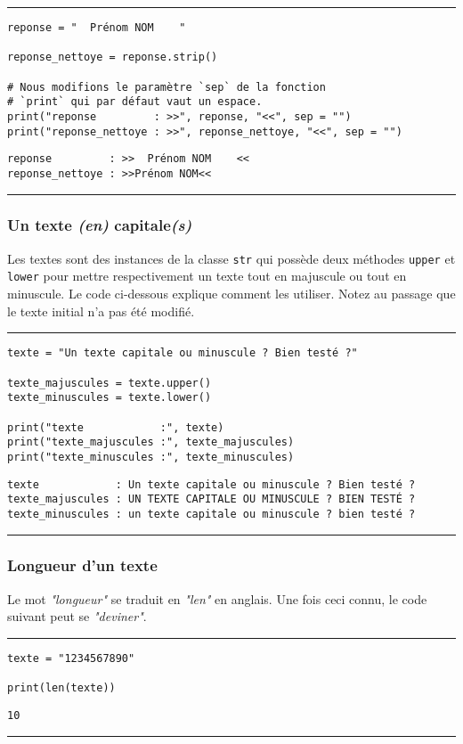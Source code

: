 \bigskip
{\hrule height .5mm}
\begin{verbatim}
reponse = "  Prénom NOM    "

reponse_nettoye = reponse.strip()

# Nous modifions le paramètre `sep` de la fonction
# `print` qui par défaut vaut un espace.
print("reponse         : >>", reponse, "<<", sep = "")
print("reponse_nettoye : >>", reponse_nettoye, "<<", sep = "")
\end{verbatim}
 \color{ForestGreen}
\vspace{-1.5em}
\begin{verbatim}
reponse         : >>  Prénom NOM    <<
reponse_nettoye : >>Prénom NOM<<
\end{verbatim} \color{Black}
{\hrule height .5mm}
\bigskip


\subsubsection{Un texte \textit{(en)} capitale\textit{(s)}}

Les textes sont des instances de la classe \texttt{str} qui possède deux méthodes \texttt{upper} et \texttt{lower} pour mettre respectivement un texte tout en majuscule ou tout en minuscule. Le code ci-dessous explique comment les utiliser. Notez au passage que le texte initial n'a pas été modifié.


\bigskip
{\hrule height .5mm}
\begin{verbatim}
texte = "Un texte capitale ou minuscule ? Bien testé ?"

texte_majuscules = texte.upper()
texte_minuscules = texte.lower()

print("texte            :", texte)
print("texte_majuscules :", texte_majuscules)
print("texte_minuscules :", texte_minuscules)
\end{verbatim}
 \color{ForestGreen}
\vspace{-1.5em}
\begin{verbatim}
texte            : Un texte capitale ou minuscule ? Bien testé ?
texte_majuscules : UN TEXTE CAPITALE OU MINUSCULE ? BIEN TESTÉ ?
texte_minuscules : un texte capitale ou minuscule ? bien testé ?
\end{verbatim} \color{Black}
{\hrule height .5mm}
\bigskip


\subsubsection{Longueur d'un texte}

Le mot \textit{"longueur"} se traduit en \textit{"len"} en anglais. Une fois ceci connu, le code suivant peut se \textit{"deviner"}.


\bigskip
{\hrule height .5mm}
\begin{verbatim}
texte = "1234567890"

print(len(texte))
\end{verbatim}
 \color{ForestGreen}
\vspace{-1.5em}
\begin{verbatim}
10
\end{verbatim} \color{Black}
{\hrule height .5mm}
\bigskip